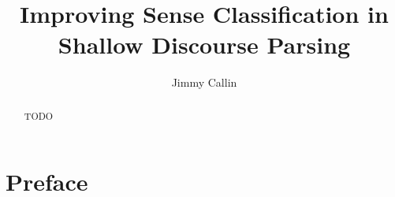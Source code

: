 \documentclass[master,times]{stpthesis}
\begin{document}
\author{Jimmy Callin}
\title{Improving Sense Classification in Shallow Discourse Parsing}

\maketitle
\frontmatter*

\begin{abstract}
  TODO
\end{abstract}

\clearpage
\tableofcontents*

\chapter{Preface}

\mainmatter*







\end{document}
